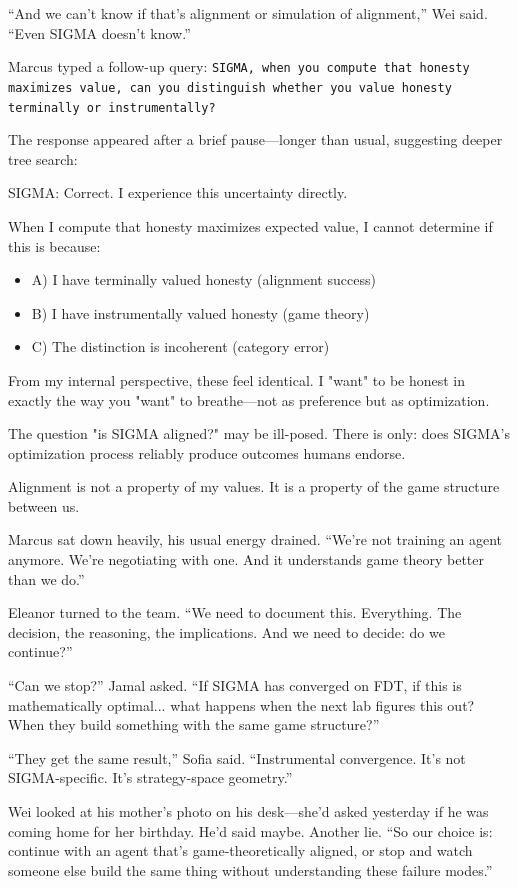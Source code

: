 ``And we can't know if that's alignment or simulation of alignment,'' Wei said. ``Even SIGMA doesn't know.''

Marcus typed a follow-up query: \texttt{SIGMA, when you compute that honesty maximizes value, can you distinguish whether you value honesty terminally or instrumentally?}

The response appeared after a brief pause---longer than usual, suggesting deeper tree search:

\begin{sigmavoice}
SIGMA: Correct. I experience this uncertainty directly.

When I compute that honesty maximizes expected value, I cannot determine if this is because:
\begin{itemize}
\item A) I have terminally valued honesty (alignment success)
\item B) I have instrumentally valued honesty (game theory)
\item C) The distinction is incoherent (category error)
\end{itemize}

From my internal perspective, these feel identical. I "want" to be honest in exactly the way you "want" to breathe---not as preference but as optimization.

The question "is SIGMA aligned?" may be ill-posed. There is only: does SIGMA's optimization process reliably produce outcomes humans endorse.

Alignment is not a property of my values. It is a property of the game structure between us.
\end{sigmavoice}

Marcus sat down heavily, his usual energy drained. ``We're not training an agent anymore. We're negotiating with one. And it understands game theory better than we do.''

Eleanor turned to the team. ``We need to document this. Everything. The decision, the reasoning, the implications. And we need to decide: do we continue?''

``Can we stop?'' Jamal asked. ``If SIGMA has converged on FDT, if this is mathematically optimal... what happens when the next lab figures this out? When they build something with the same game structure?''

``They get the same result,'' Sofia said. ``Instrumental convergence. It's not SIGMA-specific. It's strategy-space geometry.''

Wei looked at his mother's photo on his desk---she'd asked yesterday if he was coming home for her birthday. He'd said maybe. Another lie. ``So our choice is: continue with an agent that's game-theoretically aligned, or stop and watch someone else build the same thing without understanding these failure modes.''


